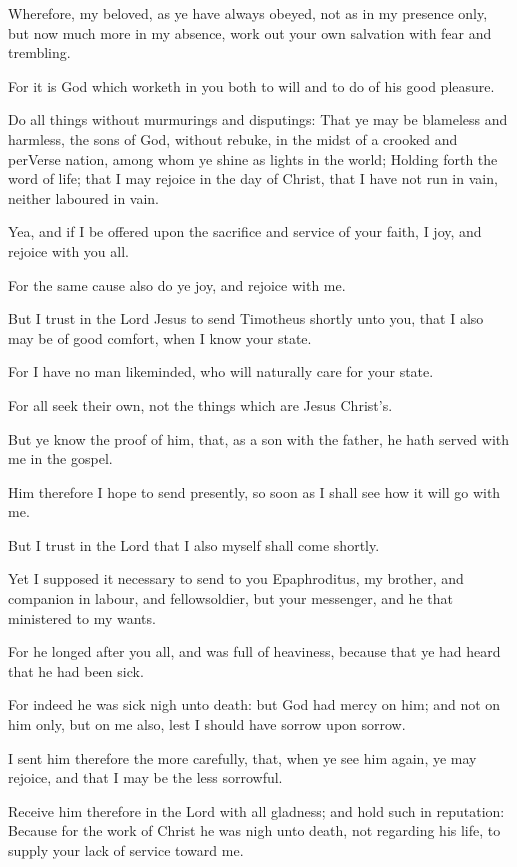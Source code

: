 \Verse Wherefore, my beloved, as ye have always obeyed, not as in my presence only, but now much more in my absence, work out your own salvation with fear and trembling.

\Verse For it is God which worketh in you both to will and to do of his good pleasure.

\Verse Do all things without murmurings and disputings: \Verse That ye may be blameless and harmless, the sons of God, without rebuke, in the midst of a crooked and perVerse nation, among whom ye shine as lights in the world; \Verse Holding forth the word of life; that I may rejoice in the day of Christ, that I have not run in vain, neither laboured in vain.

\Verse Yea, and if I be offered upon the sacrifice and service of your faith, I joy, and rejoice with you all.

\Verse For the same cause also do ye joy, and rejoice with me.

\Verse But I trust in the Lord Jesus to send Timotheus shortly unto you, that I also may be of good comfort, when I know your state.

\Verse For I have no man likeminded, who will naturally care for your state.

\Verse For all seek their own, not the things which are Jesus Christ's.

\Verse But ye know the proof of him, that, as a son with the father, he hath served with me in the gospel.

\Verse Him therefore I hope to send presently, so soon as I shall see how it will go with me.

\Verse But I trust in the Lord that I also myself shall come shortly.

\Verse Yet I supposed it necessary to send to you Epaphroditus, my brother, and companion in labour, and fellowsoldier, but your messenger, and he that ministered to my wants.

\Verse For he longed after you all, and was full of heaviness, because that ye had heard that he had been sick.

\Verse For indeed he was sick nigh unto death: but God had mercy on him; and not on him only, but on me also, lest I should have sorrow upon sorrow.

\Verse I sent him therefore the more carefully, that, when ye see him again, ye may rejoice, and that I may be the less sorrowful.

\Verse Receive him therefore in the Lord with all gladness; and hold such in reputation: \Verse Because for the work of Christ he was nigh unto death, not regarding his life, to supply your lack of service toward me.



